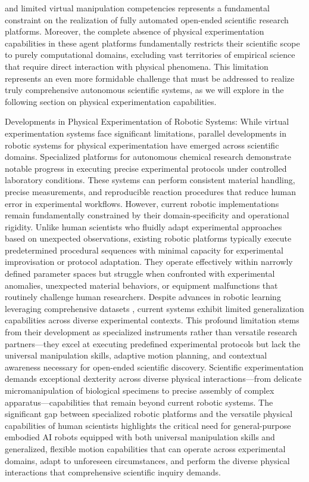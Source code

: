 and limited virtual manipulation competencies represents a fundamental constraint on the realization of fully automated open-ended scientific research platforms. Moreover, the complete absence of physical experimentation capabilities in these agent platforms fundamentally restricts their scientific scope to purely computational domains, excluding vast territories of empirical science that require direct interaction with physical phenomena. This limitation represents an even more formidable challenge that must be addressed to realize truly comprehensive autonomous scientific systems, as we will explore in the following section on physical experimentation capabilities.



Developments in Physical Experimentation of Robotic Systems: While virtual experimentation systems face significant limitations, parallel developments in robotic systems for physical experimentation have emerged across scientific domains. Specialized platforms for autonomous chemical research \cite{boiko2023autonomous, m2024augmenting} demonstrate notable progress in executing precise experimental protocols under controlled laboratory conditions. These systems can perform consistent material handling, precise measurements, and reproducible reaction procedures that reduce human error in experimental workflows. However, current robotic implementations remain fundamentally constrained by their domain-specificity and operational rigidity. Unlike human scientists who fluidly adapt experimental approaches based on unexpected observations, existing robotic platforms typically execute predetermined procedural sequences with minimal capacity for experimental improvisation or protocol adaptation. They operate effectively within narrowly defined parameter spaces but struggle when confronted with experimental anomalies, unexpected material behaviors, or equipment malfunctions that routinely challenge human researchers. Despite advances in robotic learning leveraging comprehensive datasets \cite{Openxvuong2023open, padalkar2023open}, current systems exhibit limited generalization capabilities across diverse experimental contexts. This profound limitation stems from their development as specialized instruments rather than versatile research partners—they excel at executing predefined experimental protocols but lack the universal manipulation skills, adaptive motion planning, and contextual awareness necessary for open-ended scientific discovery. Scientific experimentation demands exceptional dexterity across diverse physical interactions—from delicate micromanipulation of biological specimens to precise assembly of complex apparatus—capabilities that remain beyond current robotic systems. The significant gap between specialized robotic platforms and the versatile physical capabilities of human scientists highlights the critical need for general-purpose embodied AI robots equipped with both universal manipulation skills and generalized, flexible motion capabilities that can operate across experimental domains, adapt to unforeseen circumstances, and perform the diverse physical interactions that comprehensive scientific inquiry demands.





